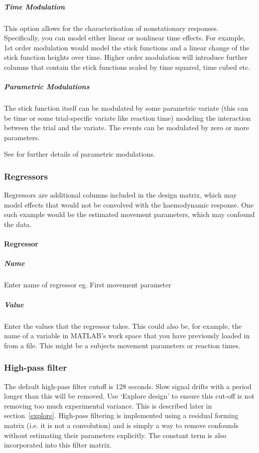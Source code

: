 \documentclass[a4paper,titlepage]{book}
\begin{document}
\subparagraph{Time Modulation}
This option allows for the characterisation of nonstationary responses.  Specifically, you can model either linear or nonlinear time effects. For example, 1st order modulation would model the stick functions and a linear change of the stick function heights over time. Higher order modulation will introduce further columns that contain the stick functions scaled by time squared, time cubed etc.

\subparagraph{Parametric Modulations}
The stick function itself can be modulated by some parametric variate (this can be time or some trial-specific variate like reaction time) modeling the interaction between the trial and the variate. The events can be modulated by zero or more parameters.

See \cite{parametric_pet,parametric_fmri} for further details of 
parametric modulations.

\subsubsection{Regressors}
Regressors are additional columns included in the design matrix, which may model effects that would not be convolved with the haemodynamic response.  One such example would be the estimated movement parameters, which may confound the data.


\paragraph{Regressor}


\subparagraph{Name}
Enter name of regressor eg. First movement parameter


\subparagraph{Value}
Enter the values that the regressor takes. This could also be, for example, the name of a variable in MATLAB's work space that you 
have previously loaded in from a file. This might be a subjects
movement parameters or reaction times.


\subsubsection{High-pass filter}
The default high-pass filter cutoff is 128 seconds. Slow signal drifts with a period longer than this will be removed. Use `Explore design' to ensure this cut-off is not removing too much experimental variance. 
This is described later in section~\ref{explore}. High-pass filtering is implemented using a residual forming matrix (i.e. it is not a convolution) and is simply a way to remove confounds without estimating their parameters explicitly.  The constant term is also incorporated into this filter matrix.
\end{document}

